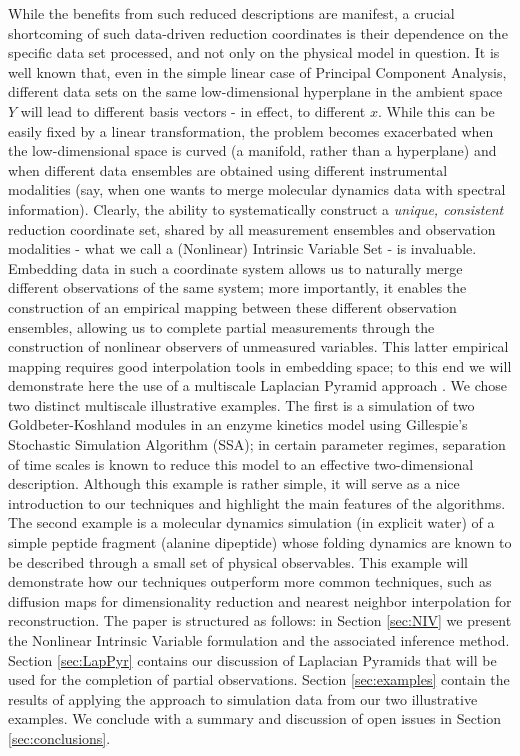 \documentclass[aip,jcp,reprint,twocolumn]{revtex4-1}
\begin{document}
%
While the benefits from such reduced descriptions are manifest, a crucial shortcoming of
such data-driven reduction coordinates is their dependence on the specific data set processed,
and not only on the physical model in question.
%
It is well known that, even in the simple linear case of Principal Component Analysis,
different data sets on the same low-dimensional hyperplane in the ambient space $Y$
will lead to different basis vectors - in effect, to different $x$.
%
While this can be easily fixed by a linear transformation, the problem becomes
exacerbated when the low-dimensional space is curved (a manifold, rather than a hyperplane)
and when different data ensembles are obtained using different instrumental modalities
(say, when one wants to merge molecular dynamics data with spectral information).
%
Clearly, the ability to systematically construct a {\em unique, consistent} reduction
coordinate set, shared by all measurement ensembles and observation modalities -
what we call a (Nonlinear) Intrinsic Variable Set - is invaluable.
%
Embedding data in such a coordinate system allows us to naturally merge different observations of the same system;
more importantly, it enables the construction of an empirical mapping between these different
observation ensembles, allowing us to complete partial measurements through the construction
of nonlinear observers of unmeasured variables.
%
This latter empirical mapping requires good interpolation tools in embedding space; to this
end we will demonstrate here the use of a multiscale Laplacian Pyramid approach \cite{rabin2012heterogeneous}.
%
We chose two distinct multiscale illustrative examples. The first is a simulation
of two Goldbeter-Koshland modules in an enzyme kinetics model \cite{zagaris2012stability} using Gillespie's Stochastic Simulation
Algorithm (SSA); in certain parameter regimes, separation of time scales is known
to reduce this model to an effective two-dimensional description.
%
Although this example is rather simple, it will serve as a nice introduction to our techniques and highlight the main features of the algorithms.
%
The second example is a molecular dynamics
simulation (in explicit water) of a simple peptide fragment (alanine dipeptide) whose folding
dynamics are known to be described through a small set of physical observables.
%
This example will demonstrate how our techniques outperform more common techniques, such as diffusion maps for dimensionality reduction
and nearest neighbor interpolation for reconstruction.
%
The paper is structured as follows: in Section \ref{sec:NIV} we present the Nonlinear Intrinsic Variable formulation and
the associated inference method. 
%
Section \ref{sec:LapPyr} contains our discussion of Laplacian Pyramids that
will be used for the completion of partial observations. 
%
Section \ref{sec:examples} contain the results
of applying the approach to simulation data from our two illustrative examples. 
%
We conclude with
a summary and discussion of open issues in Section \ref{sec:conclusions}.
\end{document}
